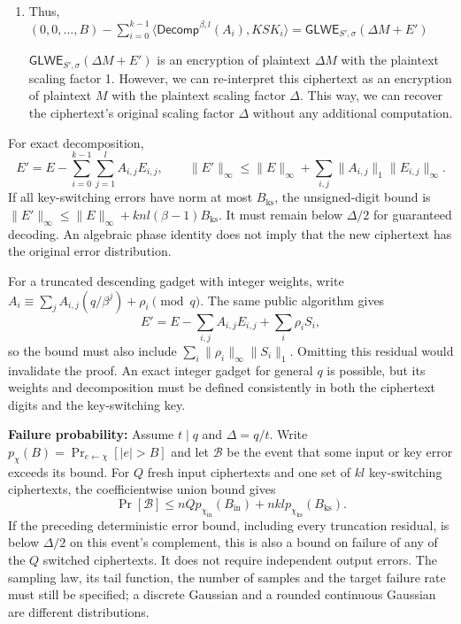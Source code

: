 \begin{myproof}
\begin{enumerate}
$ $

\item Thus, $ (0, 0, \ldots , B) - \sum \limits_{i=0}^{k-1} \langle \textsf{Decomp}^{\beta, l}(A_i), \mathit{KSK}_i \rangle = \textsf{GLWE}_{S',\sigma}(\Delta M + E') $

$\textsf{GLWE}_{S',\sigma}(\Delta M + E')$ is an encryption of plaintext $\Delta M$ with the plaintext scaling factor 1. However, we can re-interpret this ciphertext as an encryption of plaintext $M$ with the plaintext scaling factor $\Delta$. This way, we can recover the ciphertext's original scaling factor $\Delta$ without any additional computation. 
\end{enumerate}
\end{myproof}


 For exact decomposition,
\[
E'=E-\sum_{i=0}^{k-1}\sum_{j=1}^l A_{i,j}E_{i,j},\qquad
\|E'\|_\infty\le\|E\|_\infty+\sum_{i,j}\|A_{i,j}\|_1\|E_{i,j}\|_\infty.
\]
If all key-switching errors have norm at most $B_{\mathrm{ks}}$, the unsigned-digit bound is $\|E'\|_\infty\le\|E\|_\infty+knl(\beta-1)B_{\mathrm{ks}}$. It must remain below $\Delta/2$ for guaranteed decoding. An algebraic phase identity does not imply that the new ciphertext has the original error distribution.

For a truncated descending gadget with integer weights, write $A_i\equiv\sum_jA_{i,j}(q/\beta^j)+\rho_i\pmod q$. The same public algorithm gives
\[
E'=E-\sum_{i,j}A_{i,j}E_{i,j}+\sum_i\rho_iS_i,
\]
so the bound must also include $\sum_i\|\rho_i\|_\infty\|S_i\|_1$. Omitting this residual would invalidate the proof. An exact integer gadget for general $q$ is possible, but its weights and decomposition must be defined consistently in both the ciphertext digits and the key-switching key.

\noindent\textbf{Failure probability:} Assume $t\mid q$ and $\Delta=q/t$. Write $p_\chi(B)=\Pr_{e\leftarrow\chi}[|e|>B]$ and let $\mathcal B$ be the event that some input or key error exceeds its bound. For $Q$ fresh input ciphertexts and one set of $kl$ key-switching ciphertexts, the coefficientwise union bound gives
\[
\Pr[\mathcal B]
\le nQp_{\chi_{\mathrm{in}}}(B_{\mathrm{in}})+nklp_{\chi_{\mathrm{ks}}}(B_{\mathrm{ks}}).
\]
If the preceding deterministic error bound, including every truncation residual, is below $\Delta/2$ on this event's complement, this is also a bound on failure of any of the $Q$ switched ciphertexts. It does not require independent output errors. The sampling law, its tail function, the number of samples and the target failure rate must still be specified; a discrete Gaussian and a rounded continuous Gaussian are different distributions.

